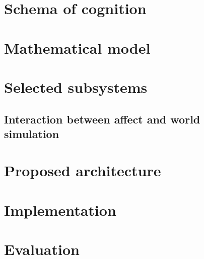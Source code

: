 \documentclass[]{scrartcl}
\begin{document}
\section{Schema of cognition}\label{sec:schemaOfCognition}



\section{Mathematical model}\label{sec:mathematicalModel}



\section{Selected subsystems}\label{sec:selectedSubsystems}



\subsection{Interaction between affect and world simulation}



\section{Proposed architecture}\label{sec:proposedArchitecture}


\section{Implementation}



\section{Evaluation}


\endgroup

\pagebreak

\nocite{*}



\end{document}
